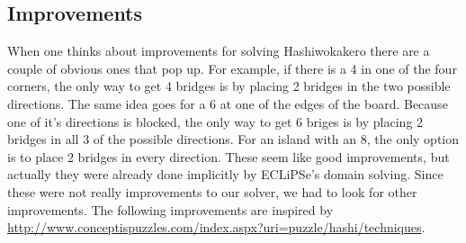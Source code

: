 \documentclass{report}
\begin{document}
\subsection{Improvements}
When one thinks about improvements for solving Hashiwokakero there are a couple of obvious ones that pop up. For example, if there is a 4 in one of the four corners, the only way to get 4 bridges is by placing 2 bridges in the two possible directions. The same idea goes for a 6 at one of the edges of the board. Because one of it's directions is blocked, the only way to get 6 briges is by placing 2 bridges in all 3 of the possible directions. For an island with an 8, the only option is to place 2 bridges in every direction. These seem like good improvements, but actually they were already done implicitly by ECLiPSe's domain solving. Since these were not really improvements to our solver, we had to look for other improvements. The following improvements are inspired by \url{http://www.conceptispuzzles.com/index.aspx?uri=puzzle/hashi/techniques}.
\end{document}
